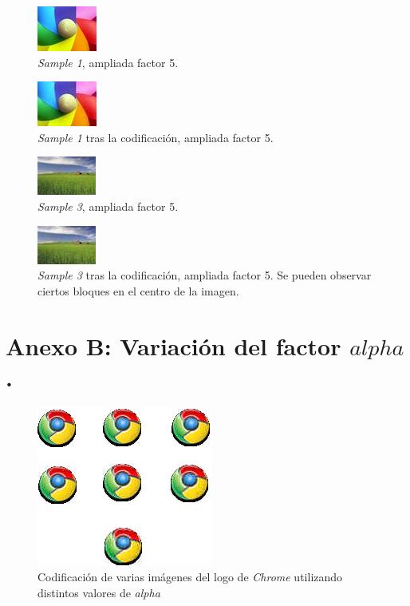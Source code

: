 \documentclass[%
	final,
	reprint,
	notitlepage,
	narroweqnarray,
	inline,
	twoside,
	invited
	]{ieee}
\begin{document}
\begin{thebibliography}{1}
\begin{figure}[H]
\centering
	\includegraphics[scale=5]{./img/sample_1_in.jpg}
	\caption{\textit{Sample 1}, ampliada factor 5.}
\end{figure}

\begin{figure}[H]
\centering
	\includegraphics[scale=5]{./img/sample_1_alpha_1_out.jpg}
	\caption{\textit{Sample 1} tras la codificación, ampliada factor 5.}
\end{figure}

\begin{figure}[H]
\centering
	\includegraphics[scale=5]{./img/sample_3_in.jpg}
	\caption{\textit{Sample 3}, ampliada factor 5.}
\end{figure}

\begin{figure}[H]
\centering
	\includegraphics[scale=5]{./img/sample_3_alpha_1_out.jpg}
	\caption{\textit{Sample 3} tras la codificación, ampliada factor 5. Se pueden observar ciertos bloques en el centro de la imagen.}
\end{figure}

\section*{Anexo B: Variación del factor $alpha$.}

\begin{figure}[H]
\centering
	\includegraphics[scale=3]{./img/chrome.bmp}
	\caption{Codificación de varias imágenes del logo de \textit{Chrome} utilizando distintos valores de \textit{alpha}}
\end{figure}


\end{thebibliography}
\end{document}
